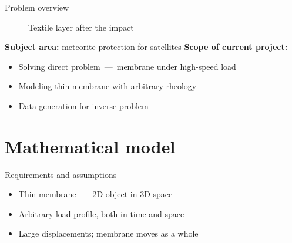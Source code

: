 \documentclass[10pt]{beamer}
\numberwithin{equation}{subsection}
\begin{document}
\begin{frame}[fragile]{Problem overview}
\begin{figure}
\begin{minipage}{0.33\textwidth}
        \caption{Textile layer after the impact}
	\end{minipage}
	\end{figure}
	\vfill
	\textbf{Subject area:} meteorite protection for satellites
	\vfill
	\textbf{Scope of current project:}
	\begin{itemize}
	    \item Solving direct problem~---~membrane under high-speed load
	    \item Modeling thin membrane with arbitrary rheology
	    \item Data generation for inverse problem
	\end{itemize}
\end{frame}

\section{Mathematical model}

\begin{frame}{Requirements and assumptions}
    \begin{itemize}
	    \item Thin membrane~---~2D object in 3D space
	    \item Arbitrary load profile, both in time and space
	    \item Large displacements; membrane moves as a whole
    \end{itemize}
\end{frame}
\end{document}
